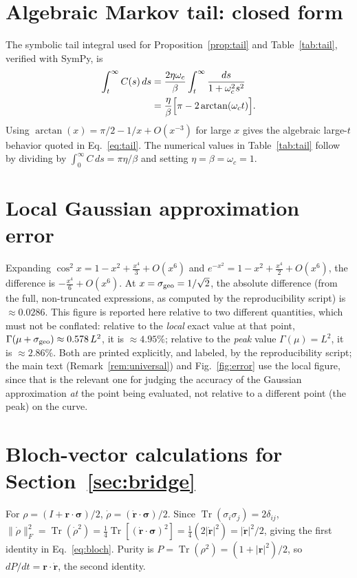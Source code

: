 \documentclass[aps,pra,reprint,superscriptaddress,nofootinbib,longbibliography]{revtex4-2}
\newcommand{\tr}{\operatorname{Tr}}
\begin{document}
\section{Algebraic Markov tail: closed form}
\label{app:tail}

The symbolic tail integral used for Proposition~\ref{prop:tail} and
Table~\ref{tab:tail}, verified with SymPy, is
\begin{align}
\int_t^\infty C(s)\,ds
&= \frac{2\eta\omega_c}{\beta}\int_t^\infty\frac{ds}{1+\omega_c^2s^2}\notag\\
&= \frac{\eta}{\beta}\Bigl[\pi-2\arctan(\omega_c t)\Bigr].
\end{align}
Using $\arctan(x)=\pi/2-1/x+O(x^{-3})$ for large $x$ gives the
algebraic large-$t$ behavior quoted in Eq.~\eqref{eq:tail}. The
numerical values in Table~\ref{tab:tail} follow by dividing by
$\int_0^\infty C\,ds=\pi\eta/\beta$ and setting $\eta=\beta=\omega_c=1$.

\section{Local Gaussian approximation error}
\label{app:gausserror}

Expanding $\cos^2 x = 1 - x^2 + \frac{x^4}{3} + O(x^6)$ and
$e^{-x^2} = 1 - x^2 + \frac{x^4}{2} + O(x^6)$, the difference is
$-\frac{x^4}{6} + O(x^6)$. At $x=\sigma_{\rm geo}=1/\sqrt{2}$, the
absolute difference (from the full, non-truncated expressions, as
computed by the reproducibility script) is $\approx0.0286$. This
figure is reported here relative to two different quantities, which
must not be conflated: relative to the \emph{local} exact value at
that point, $\Gamma(\mu+\sigma_{\rm geo})\approx0.578\,L^2$, it is
$\approx4.95\%$; relative to the \emph{peak} value $\Gamma(\mu)=L^2$,
it is $\approx2.86\%$. Both are printed explicitly, and labeled, by
the reproducibility script; the main text (Remark~\ref{rem:universal})
and Fig.~\ref{fig:error} use the local figure, since that is the
relevant one for judging the accuracy of the Gaussian approximation
\emph{at} the point being evaluated, not relative to a different point
(the peak) on the curve.

\section{Bloch-vector calculations for Section~\ref{sec:bridge}}
\label{app:bloch}

For $\rho=(I+\mathbf r\cdot\boldsymbol\sigma)/2$,
$\dot\rho=(\dot{\mathbf r}\cdot\boldsymbol\sigma)/2$. Since
$\tr(\sigma_i\sigma_j)=2\delta_{ij}$,
$\|\dot\rho\|_F^2=\tr(\dot\rho^2)=\tfrac14\tr[(\dot{\mathbf r}\cdot\boldsymbol\sigma)^2]
=\tfrac14(2|\dot{\mathbf r}|^2)=|\dot{\mathbf r}|^2/2$, giving the
first identity in Eq.~\eqref{eq:bloch}. Purity is
$P=\tr(\rho^2)=(1+|\mathbf r|^2)/2$, so $dP/dt=\mathbf r\cdot\dot{\mathbf r}$,
the second identity.
\end{document}

